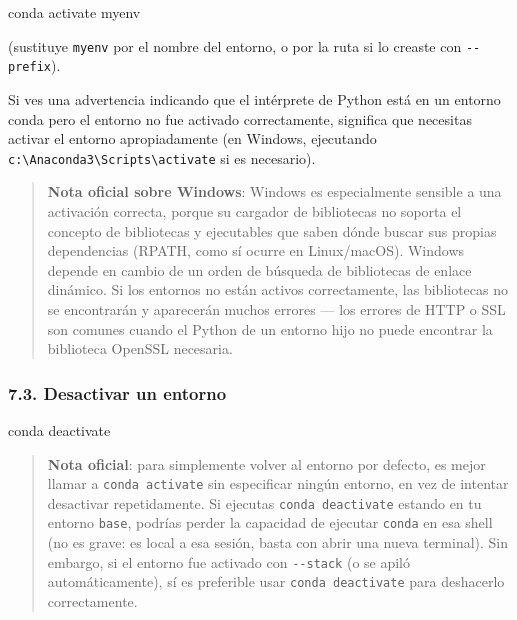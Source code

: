 \documentclass[
  doc,
  floatsintext,
  longtable,
  a4paper,
  nolmodern,
  notxfonts,
  notimes,
  12pt,
  colorlinks=true,linkcolor=blue,citecolor=blue,urlcolor=blue]{apa7}
\newenvironment{Shaded}{\begin{snugshade}}{\end{snugshade}}
\newcommand{\ExtensionTok}[1]{\textcolor[rgb]{0.00,0.23,0.31}{#1}}
\newcommand{\NormalTok}[1]{\textcolor[rgb]{0.00,0.23,0.31}{#1}}
\begin{document}
\begin{Shaded}
\begin{Highlighting}[]
\ExtensionTok{conda}\NormalTok{ activate myenv}
\end{Highlighting}
\end{Shaded}

(sustituye \texttt{myenv} por el nombre del entorno, o por la ruta si lo
creaste con \texttt{-\/-prefix}).

Si ves una advertencia indicando que el intérprete de Python está en un
entorno conda pero el entorno no fue activado correctamente, significa
que necesitas activar el entorno apropiadamente (en Windows, ejecutando
\texttt{c:\textbackslash{}Anaconda3\textbackslash{}Scripts\textbackslash{}activate}
si es necesario).

\begin{quote}
\textbf{Nota oficial sobre Windows}: Windows es especialmente sensible a
una activación correcta, porque su cargador de bibliotecas no soporta el
concepto de bibliotecas y ejecutables que saben dónde buscar sus propias
dependencias (RPATH, como sí ocurre en Linux/macOS). Windows depende en
cambio de un orden de búsqueda de bibliotecas de enlace dinámico. Si los
entornos no están activos correctamente, las bibliotecas no se
encontrarán y aparecerán muchos errores --- los errores de HTTP o SSL
son comunes cuando el Python de un entorno hijo no puede encontrar la
biblioteca OpenSSL necesaria.
\end{quote}

\subsubsection{7.3. Desactivar un entorno}\label{desactivar-un-entorno}

\begin{Shaded}
\begin{Highlighting}[]
\ExtensionTok{conda}\NormalTok{ deactivate}
\end{Highlighting}
\end{Shaded}

\begin{quote}
\textbf{Nota oficial}: para simplemente volver al entorno por defecto,
es mejor llamar a \texttt{conda\ activate} sin especificar ningún
entorno, en vez de intentar desactivar repetidamente. Si ejecutas
\texttt{conda\ deactivate} estando en tu entorno \texttt{base}, podrías
perder la capacidad de ejecutar \texttt{conda} en esa shell (no es
grave: es local a esa sesión, basta con abrir una nueva terminal). Sin
embargo, si el entorno fue activado con \texttt{-\/-stack} (o se apiló
automáticamente), sí es preferible usar \texttt{conda\ deactivate} para
deshacerlo correctamente.
\end{quote}
\end{document}
